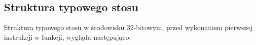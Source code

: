 \subsection{Struktura typowego stosu}

Struktura typowego stosu w środowisku 32-bitowym,
przed wykonaniem pierwszej instrukcji w funkcji, wygląda następująco:






